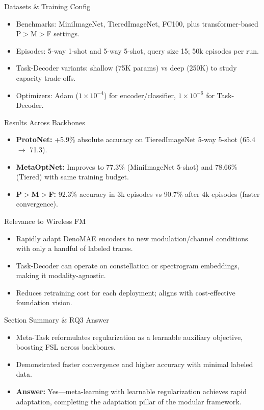 \begin{frame}{Datasets \& Training Config}
    \begin{itemize}
        \item Benchmarks: MiniImageNet, TieredImageNet, FC100, plus transformer-based P$>$M$>$F settings.
        \item Episodes: 5-way 1-shot and 5-way 5-shot, query size 15; 50k episodes per run.
        \item Task-Decoder variants: shallow (75K params) vs deep (250K) to study capacity trade-offs.
        \item Optimizers: Adam ($1\!\times\!10^{-4}$) for encoder/classifier, $1\!\times\!10^{-6}$ for Task-Decoder.
    \end{itemize}
\end{frame}

\begin{frame}{Results Across Backbones}
    \begin{itemize}
        \item \textbf{ProtoNet:} +5.9\% absolute accuracy on TieredImageNet 5-way 5-shot (65.4 $\rightarrow$ 71.3).
        \item \textbf{MetaOptNet:} Improves to 77.3\% (MiniImageNet 5-shot) and 78.66\% (Tiered) with same training budget.
        \item \textbf{P$>$M$>$F:} 92.3\% accuracy in 3k episodes vs 90.7\% after 4k episodes (faster convergence).
    \end{itemize}
\end{frame}

\begin{frame}{Relevance to Wireless FM}
    \begin{itemize}
        \item Rapidly adapt DenoMAE encoders to new modulation/channel conditions with only a handful of labeled traces.
        \item Task-Decoder can operate on constellation or spectrogram embeddings, making it modality-agnostic.
        \item Reduces retraining cost for each deployment; aligns with cost-effective foundation vision.
    \end{itemize}
\end{frame}

\begin{frame}{Section Summary \& RQ3 Answer}
    \begin{itemize}
        \item Meta-Task reformulates regularization as a learnable auxiliary objective, boosting FSL across backbones.
        \item Demonstrated faster convergence and higher accuracy with minimal labeled data.
        \item \textbf{Answer:} Yes—meta-learning with learnable regularization achieves rapid adaptation, completing the adaptation pillar of the modular framework.
    \end{itemize}
\end{frame}

